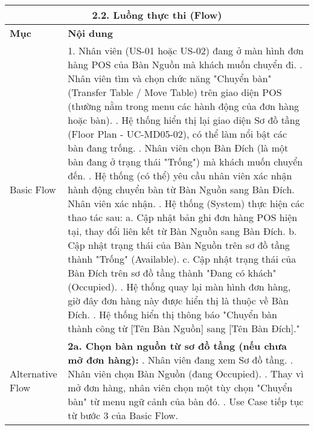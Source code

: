 \begin{longtable}{|m{4cm}|p{11cm}|}
\hline
\multicolumn{2}{|c|}{\textbf{2.2. Luồng thực thi (Flow)}} \\
\hline
\textbf{Mục} & \textbf{Nội dung} \\
\hline
Basic Flow & 1. Nhân viên (US-01 hoặc US-02) đang ở màn hình đơn hàng POS của Bàn Nguồn mà khách muốn chuyển đi. \newline 2. Nhân viên tìm và chọn chức năng "Chuyển bàn" (Transfer Table / Move Table) trên giao diện POS (thường nằm trong menu các hành động của đơn hàng hoặc bàn). \newline 3. Hệ thống hiển thị lại giao diện Sơ đồ tầng (Floor Plan - UC-MD05-02), có thể làm nổi bật các bàn đang trống. \newline 4. Nhân viên chọn Bàn Đích (là một bàn đang ở trạng thái "Trống") mà khách muốn chuyển đến. \newline 5. Hệ thống (có thể) yêu cầu nhân viên xác nhận hành động chuyển bàn từ Bàn Nguồn sang Bàn Đích. Nhân viên xác nhận. \newline 6. Hệ thống (System) thực hiện các thao tác sau: \newline    a. Cập nhật bản ghi đơn hàng POS hiện tại, thay đổi liên kết từ Bàn Nguồn sang Bàn Đích. \newline    b. Cập nhật trạng thái của Bàn Nguồn trên sơ đồ tầng thành "Trống" (Available). \newline    c. Cập nhật trạng thái của Bàn Đích trên sơ đồ tầng thành "Đang có khách" (Occupied). \newline 7. Hệ thống quay lại màn hình đơn hàng, giờ đây đơn hàng này được hiển thị là thuộc về Bàn Đích. \newline 8. Hệ thống hiển thị thông báo "Chuyển bàn thành công từ [Tên Bàn Nguồn] sang [Tên Bàn Đích]." \\
\hline
Alternative Flow & \textbf{2a. Chọn bàn nguồn từ sơ đồ tầng (nếu chưa mở đơn hàng):} \newline    1. Nhân viên đang xem Sơ đồ tầng. \newline    2. Nhân viên chọn Bàn Nguồn (đang Occupied). \newline    3. Thay vì mở đơn hàng, nhân viên chọn một tùy chọn "Chuyển bàn" từ menu ngữ cảnh của bàn đó. \newline    4. Use Case tiếp tục từ bước 3 của Basic Flow. \\
\hline

\end{longtable}
